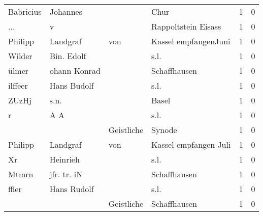 \begin{center}
\begin{tiny}
\begin{longtabu}{llllrr}
                Babricius &                           Johannes &             &                                        Chur &          1 &         0 \\
                      ... &                                  v &             &                         Rappoltstein Eisass &          1 &         0 \\
                  Philipp &                           Landgraf &         von &                        Kassel empfangenJuni &          1 &         0 \\
                   Wilder &                         Bin. Edolf &             &                                        s.l. &          1 &         0 \\
                    ülmer &                       ohann Konrad &             &                                Schaffhausen &          1 &         0 \\
                  ilffeer &                        Hans Budolf &             &                                        s.l. &          1 &         0 \\
                    ZUzHj &                               s.n. &             &                                       Basel &          1 &         0 \\
                        r &                                A A &             &                                        s.l. &          1 &         0 \\
                          &                                    &  Geistliche &                                      Synode &          1 &         0 \\
                  Philipp &                           Landgraf &         von &                       Kassel empfangen Juli &          1 &         0 \\
                       Xr &                           Heinrieh &             &                                        s.l. &          1 &         0 \\
                    Mtmrn &                        jfr. tr. iN &             &                                Schaffhausen &          1 &         0 \\
                    ffier &                        Hans Rudolf &             &                                        s.l. &          1 &         0 \\
                          &                                    &  Geistliche &                                Schaffhausen &          1 &         0 \\

\end{longtabu}
\end{tiny}
\end{center}

